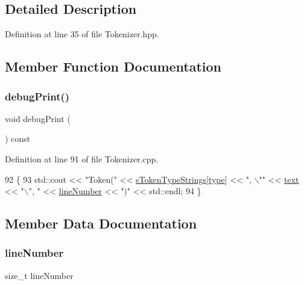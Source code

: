 \subsection{Detailed Description}


Definition at line 35 of file Tokenizer.\+hpp.



\subsection{Member Function Documentation}
\mbox{\label{classft_1_1_token_ad5cb0ada03653eb2e1c8947f05c07ad6}} 
\subsubsection{\texorpdfstring{debug\+Print()}{debugPrint()}}
{\footnotesize\ttfamily void debug\+Print (\begin{DoxyParamCaption}{ }\end{DoxyParamCaption}) const}



Definition at line 91 of file Tokenizer.\+cpp.


\begin{DoxyCode}
92     \{
93         std::cout << \textcolor{stringliteral}{"Token("} << \hyperlink{namespaceft_a1b9b00bc284da71346729142b8560e03}{sTokenTypeStrings}[\hyperlink{classft_1_1_token_a9ba17ef6e6c544012e04da10a6d461e5}{type}] << \textcolor{stringliteral}{", \(\backslash\)""} << 
      \hyperlink{classft_1_1_token_a23c058547fbc73b5659191844a9f258c}{text} << \textcolor{stringliteral}{"\(\backslash\)", "} << \hyperlink{classft_1_1_token_a996a051ecda6b841e4b58246536a7006}{lineNumber} << \textcolor{stringliteral}{")"} << std::endl;
94     \}
\end{DoxyCode}


\subsection{Member Data Documentation}
\mbox{\label{classft_1_1_token_a996a051ecda6b841e4b58246536a7006}} 
\subsubsection{\texorpdfstring{line\+Number}{lineNumber}}
{\footnotesize\ttfamily size\+\_\+t line\+Number}



